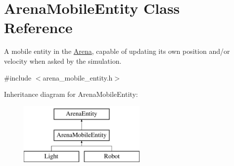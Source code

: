 \hypertarget{class_arena_mobile_entity}{}\section{Arena\+Mobile\+Entity Class Reference}
\label{class_arena_mobile_entity}


A mobile entity in the \hyperlink{class_arena}{Arena}, capable of updating its own position and/or velocity when asked by the simulation.  




{\ttfamily \#include $<$arena\+\_\+mobile\+\_\+entity.\+h$>$}

Inheritance diagram for Arena\+Mobile\+Entity\+:\begin{figure}[H]
\begin{center}
\leavevmode
\includegraphics[height=3.000000cm]{class_arena_mobile_entity}
\end{center}
\end{figure}
